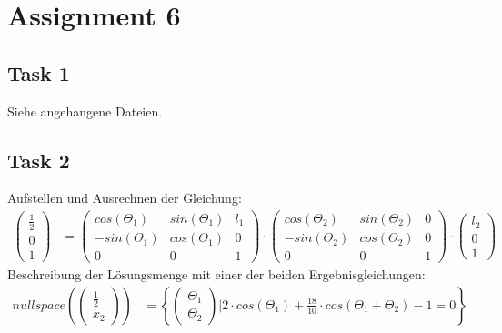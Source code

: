 \chapter{Assignment 6}\label{ass6}

\section{Task 1}\label{ass6_t1}

Siehe angehangene Dateien.

\section{Task 2}\label{ass6_t2}

Aufstellen und Ausrechnen der Gleichung:
\begin{align*}
\left( \begin{matrix} \frac{1}{2} \\ 0 \\ 1 \end{matrix} \right) &= \left( \begin{matrix} cos(\Theta_1) & sin(\Theta_1) & l_1 \\ -sin(\Theta_1) & cos(\Theta_1) & 0 \\ 0 & 0 & 1 \end{matrix} \right) \cdot \left( \begin{matrix} cos(\Theta_2) & sin(\Theta_2) & 0 \\ -sin(\Theta_2) & cos(\Theta_2) & 0 \\ 0 & 0 & 1 \end{matrix} \right) \cdot \left( \begin{matrix} l_2 \\ 0 \\ 1 \end{matrix} \right)
\end{align*}
Beschreibung der Lösungsmenge mit einer der beiden Ergebnisgleichungen:
\begin{align*}
nullspace \left( \left( \begin{matrix} \frac{1}{2} \\ x_2 \end{matrix} \right) \right) &= \left\lbrace \left( \begin{matrix}\Theta_1 \\ \Theta_2 \end{matrix} \right) | 2 \cdot cos(\Theta_1) + \frac{18}{10} \cdot cos(\Theta_1 + \Theta_2) -1 = 0 \right\rbrace\\
\end{align*}
